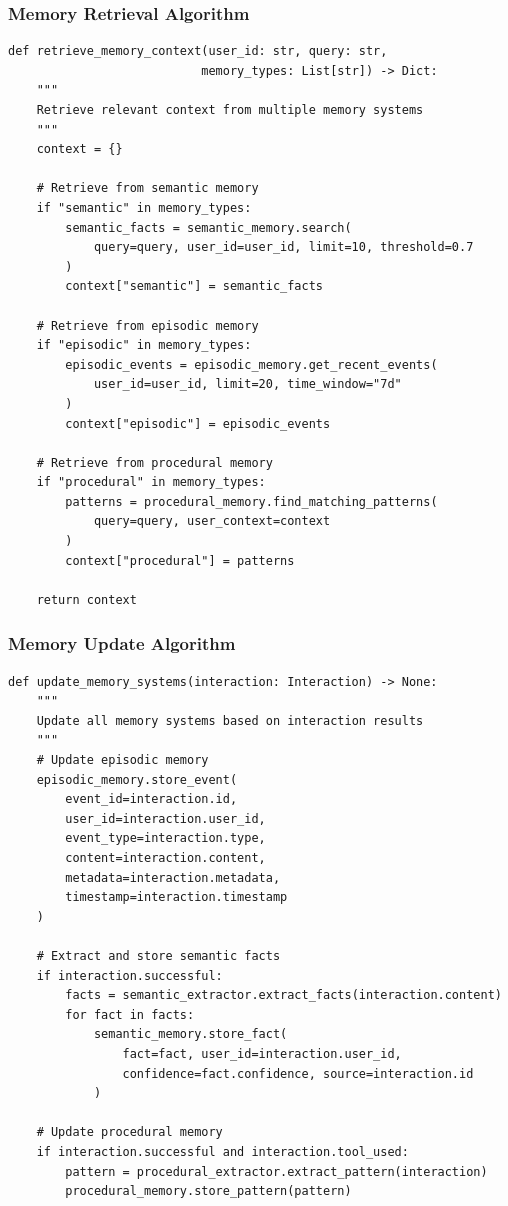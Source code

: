 \documentclass[11pt]{article}
\begin{document}
\subsubsection{Memory Retrieval Algorithm}

\begin{verbatim}
def retrieve_memory_context(user_id: str, query: str, 
                           memory_types: List[str]) -> Dict:
    """
    Retrieve relevant context from multiple memory systems
    """
    context = {}
    
    # Retrieve from semantic memory
    if "semantic" in memory_types:
        semantic_facts = semantic_memory.search(
            query=query, user_id=user_id, limit=10, threshold=0.7
        )
        context["semantic"] = semantic_facts
    
    # Retrieve from episodic memory
    if "episodic" in memory_types:
        episodic_events = episodic_memory.get_recent_events(
            user_id=user_id, limit=20, time_window="7d"
        )
        context["episodic"] = episodic_events
    
    # Retrieve from procedural memory
    if "procedural" in memory_types:
        patterns = procedural_memory.find_matching_patterns(
            query=query, user_context=context
        )
        context["procedural"] = patterns
    
    return context
\end{verbatim}

\subsubsection{Memory Update Algorithm}

\begin{verbatim}
def update_memory_systems(interaction: Interaction) -> None:
    """
    Update all memory systems based on interaction results
    """
    # Update episodic memory
    episodic_memory.store_event(
        event_id=interaction.id,
        user_id=interaction.user_id,
        event_type=interaction.type,
        content=interaction.content,
        metadata=interaction.metadata,
        timestamp=interaction.timestamp
    )
    
    # Extract and store semantic facts
    if interaction.successful:
        facts = semantic_extractor.extract_facts(interaction.content)
        for fact in facts:
            semantic_memory.store_fact(
                fact=fact, user_id=interaction.user_id,
                confidence=fact.confidence, source=interaction.id
            )
    
    # Update procedural memory
    if interaction.successful and interaction.tool_used:
        pattern = procedural_extractor.extract_pattern(interaction)
        procedural_memory.store_pattern(pattern)
\end{verbatim}
\end{document}
